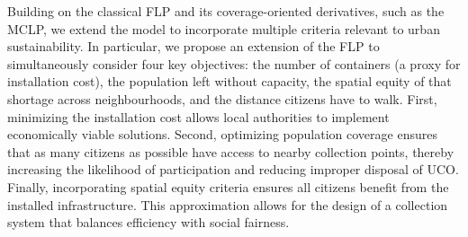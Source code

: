 Building on the classical FLP and its coverage-oriented derivatives, such as the MCLP, we extend the model to incorporate multiple criteria relevant to urban sustainability. In particular, we propose an extension of the FLP to simultaneously consider four key objectives: the number of containers (a proxy for installation cost), the population left without capacity, the spatial equity of that shortage across neighbourhoods, and the distance citizens have to walk. First, minimizing the installation cost allows local authorities to implement economically viable solutions. Second, optimizing population coverage ensures that as many citizens as possible have access to nearby collection points, thereby increasing the likelihood of participation and reducing improper disposal of UCO. Finally, incorporating spatial equity criteria ensures all citizens benefit from the installed infrastructure. This approximation allows for the design of a collection system that balances efficiency with social fairness. 

